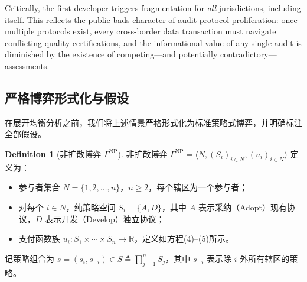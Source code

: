 \documentclass[12pt,a4paper]{ctexart}
\theoremstyle{definition}
\newtheorem{definition}{Definition}[section]
\theoremstyle{remark}
\begin{document}
Critically, the first developer triggers fragmentation for \textit{all} jurisdictions, including itself. This reflects the public-bads character of audit protocol proliferation: once multiple protocols exist, every cross-border data transaction must navigate conflicting quality certifications, and the informational value of any single audit is diminished by the existence of competing—and potentially contradictory—assessments.

\subsection{严格博弈形式化与假设}

在展开均衡分析之前，我们将上述情景严格形式化为标准策略式博弈，并明确标注全部假设。

\begin{definition}[非扩散博弈 $\Gamma^{\text{NP}}$]
非扩散博弈 $\Gamma^{\text{NP}} = \langle N, (S_i)_{i \in N}, (u_i)_{i \in N} \rangle$ 定义为：
\begin{itemize}
\item 参与者集合 $N = \{1, 2, \ldots, n\}$，$n \geq 2$，每个辖区为一个参与者；
\item 对每个 $i \in N$，纯策略空间 $S_i = \{A, D\}$，其中 $A$ 表示采纳（Adopt）现有协议，$D$ 表示开发（Develop）独立协议；
\item 支付函数族 $u_i: S_1 \times \cdots \times S_n \to \mathbb{R}$，定义如方程(4)--(5)所示。
\end{itemize}
记策略组合为 $s = (s_i, s_{-i}) \in S \triangleq \prod_{j=1}^n S_j$，其中 $s_{-i}$ 表示除 $i$ 外所有辖区的策略。
\end{definition}
\end{document}
